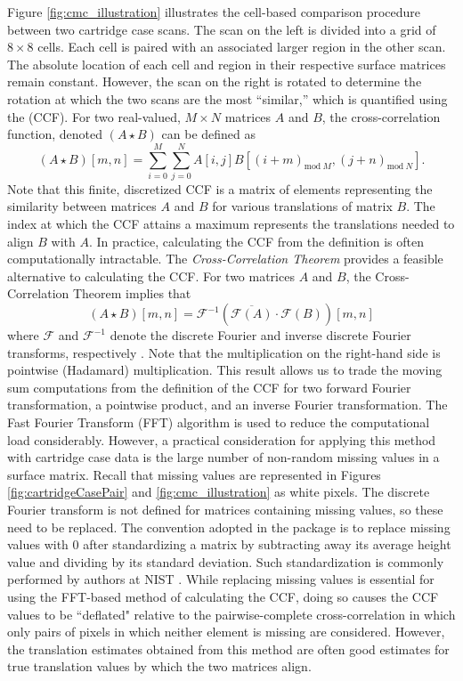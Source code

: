 Figure \ref{fig:cmc_illustration} illustrates the cell-based comparison
procedure between two cartridge case scans. The scan on the left is
divided into a grid of \(8 \times 8\) cells. Each cell is paired with an
associated larger region in the other scan. The absolute location of
each cell and region in their respective surface matrices remain
constant. However, the scan on the right is rotated to determine the
rotation at which the two scans are the most ``similar,'' which is
quantified using the  (CCF). For two
real-valued, \(M \times N\) matrices \(A\) and \(B\), the
cross-correlation function, denoted \((A \star B)\) can be defined as \[
(A \star B)[m,n] = \sum_{i=0}^M \sum_{j=0}^N A[i,j] B[(i + m)_{\text{mod}\ M}, (j + n)_{\text{mod}\ N}].
\] Note that this finite, discretized CCF is a matrix of elements
representing the similarity between matrices \(A\) and \(B\) for various
translations of matrix \(B\). The index at which the CCF attains a
maximum represents the translations needed to align \(B\) with \(A\). In
practice, calculating the CCF from the definition is often
computationally intractable. The \emph{Cross-Correlation Theorem}
provides a feasible alternative to calculating the CCF. For two matrices
\(A\) and \(B\), the Cross-Correlation Theorem implies that \[
(A \star B )[m,n]= \mathcal{F}^{-1}\left(\overline{\mathcal{F}(A)} \cdot \mathcal{F}(B)\right)[m,n]
\] where \(\mathcal{F}\) and \(\mathcal{F}^{-1}\) denote the discrete
Fourier and inverse discrete Fourier transforms, respectively
\citep{fft_brigham}. Note that the multiplication on the right-hand side
is pointwise (Hadamard) multiplication. This result allows us to trade
the moving sum computations from the definition of the CCF for two
forward Fourier transformation, a pointwise product, and an inverse
Fourier transformation. The Fast Fourier Transform (FFT) algorithm is
used to reduce the computational load considerably. However, a practical
consideration for applying this method with cartridge case data is the
large number of non-random missing values in a surface matrix. Recall
that missing values are represented in Figures
\ref{fig:cartridgeCasePair} and \ref{fig:cmc_illustration} as white
pixels. The discrete Fourier transform is not defined for matrices
containing missing values, so these need to be replaced. The convention
adopted in the  package is to replace missing values with 0
after standardizing a matrix by subtracting away its average height
value and dividing by its standard deviation. Such standardization is
commonly performed by authors at NIST \citep{ott_applying_2017}. While
replacing missing values is essential for using the FFT-based method of
calculating the CCF, doing so causes the CCF values to be ``deflated"
relative to the pairwise-complete cross-correlation in which only pairs
of pixels in which neither element is missing are considered. However,
the translation estimates obtained from this method are often good
estimates for true translation values by which the two matrices align.

